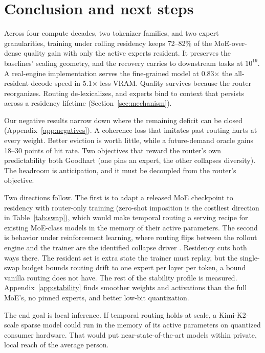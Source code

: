 \documentclass{article}
\begin{document}
\section{Conclusion and next steps}\label{sec:outlook}

Across four compute decades, two tokenizer families, and two expert granularities, training under
rolling residency keeps 72--82\% of the MoE-over-dense quality gain with only the active experts
resident. It preserves the baselines' scaling geometry, and the recovery carries to downstream
tasks at $10^{19}$. A real-engine implementation serves the fine-grained model at 0.83$\times$
the all-resident decode speed in 5.1$\times$ less VRAM. Quality survives because the router
reorganizes. Routing de-lexicalizes, and experts bind to context that persists across a residency
lifetime (Section~\ref{sec:mechanism}).

Our negative results narrow down where the remaining deficit can be closed
(Appendix~\ref{app:negatives}). A coherence loss that imitates past routing hurts at every
weight. Better eviction is worth little, while a future-demand oracle gains 18--30 points of hit
rate. Two objectives that reward the router's own predictability both Goodhart (one pins an
expert, the other collapses diversity). The headroom is anticipation, and it must be decoupled
from the router's objective.

Two directions follow. The first is to adapt a released MoE checkpoint to residency with
router-only training (zero-shot imposition is the costliest direction in Table~\ref{tab:swap}),
which would make temporal routing a serving recipe for existing MoE-class models in the memory
of their active parameters. The second is behavior under reinforcement learning, where routing flips between the rollout
engine and the trainer are the identified collapse driver \cite{ma2025r3,zheng2025gspo}.
Residency cuts both ways there. The resident set is extra state the trainer must replay, but the
single-swap budget bounds routing drift to one expert per layer per token, a bound vanilla
routing does not have. The rest of the stability profile is measured.
Appendix~\ref{app:stability} finds smoother weights and activations than the full MoE's, no
pinned experts, and better low-bit quantization.

The end goal is local inference. If temporal routing holds at scale, a Kimi-K2-scale sparse model
\cite{kimik2} could run in the memory of its active parameters on quantized consumer hardware.
That would put near-state-of-the-art models within private, local reach of the average person.
\end{document}
